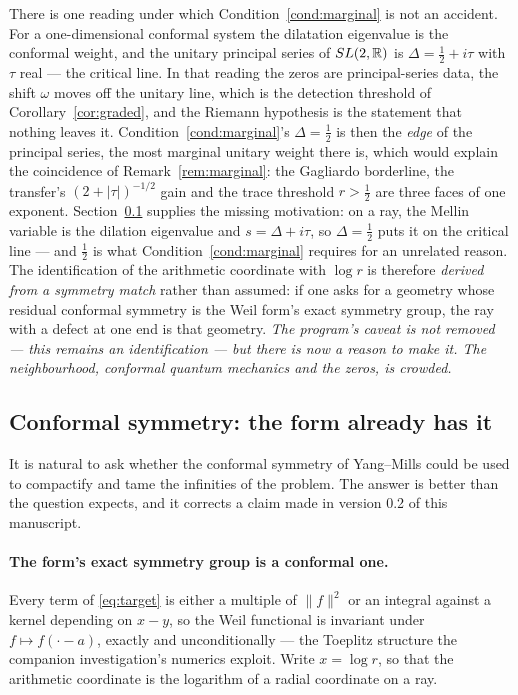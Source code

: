 \begin{remark}
\label{rem:principal}
There is one reading under which Condition~\ref{cond:marginal} is not an accident.
For a one-dimensional conformal system the dilatation eigenvalue is the conformal
weight, and the unitary principal series of $SL(2,\mathbb R)$ is $\Delta=\frac12+i\tau$
with $\tau$ real --- the critical line. In that reading the zeros are
principal-series data, the shift $\omega$ moves off the unitary line, which is the
detection threshold of Corollary~\ref{cor:graded}, and the Riemann hypothesis is
the statement that nothing leaves it. Condition~\ref{cond:marginal}'s
$\Delta=\frac12$ is then the \emph{edge} of the principal series, the most
marginal unitary weight there is, which would explain the coincidence of
Remark~\ref{rem:marginal}: the Gagliardo borderline, the transfer's
$(2+|\tau|)^{-1/2}$ gain and the trace threshold $r>\frac12$ are three faces of
one exponent. Section~\ref{subsec:conformal} supplies the missing motivation: on a ray, the
Mellin variable is the dilation eigenvalue and $s=\Delta+i\tau$, so
$\Delta=\frac12$ puts it on the critical line --- and $\frac12$ is what
Condition~\ref{cond:marginal} requires for an unrelated reason. The identification
of the arithmetic coordinate with $\log r$ is therefore \emph{derived from a
symmetry match} rather than assumed: if one asks for a geometry whose residual
conformal symmetry is the Weil form's exact symmetry group, the ray with a defect
at one end is that geometry. \emph{The program's caveat is not removed --- this
remains an identification --- but there is now a reason to make it. The
neighbourhood, conformal quantum mechanics and the zeros, is crowded.}
\end{remark}

\subsection{Conformal symmetry: the form already has it}\label{subsec:conformal}

It is natural to ask whether the conformal symmetry of Yang--Mills could be used
to compactify and tame the infinities of the problem. The answer is better than
the question expects, and it corrects a claim made in version 0.2 of this
manuscript.

\paragraph{The form's exact symmetry group is a conformal one.}
Every term of \eqref{eq:target} is either a multiple of $\lVert f\rVert^2$ or an
integral against a kernel depending on $x-y$, so the Weil functional is invariant
under $f\mapsto f(\cdot-a)$, exactly and unconditionally --- the Toeplitz
structure the companion investigation's numerics exploit. Write $x=\log r$, so
that the arithmetic coordinate is the logarithm of a radial coordinate on a ray.

